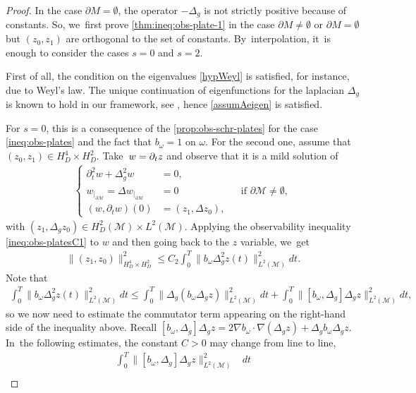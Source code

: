 \documentclass[10pt]{amsart}
\theoremstyle{definition}
\let\mc\mathcal
\newcommand{\M}{\mc{M}}
\providecommand{\norm}[1]{\lVert#1\rVert}
\begin{document}
\begin{proof}
In the case $\partial M= \emptyset$, the operator $-\Delta_g$ is not strictly positive because of constants. So, we~first prove \eqref{thm:ineq:obs-plate-1} in the case $\partial M\neq \emptyset$ or $\partial M= \emptyset$ but $(z_0, z_1)$ are orthogonal to the set of constants. By~interpolation, it~is enough to consider the cases $s=0$ and $s=2$.

First of all, the condition on the eigenvalues \eqref{hypWeyl} is satisfied, for instance, due to Weyl's law. The unique continuation of eigenfunctions for the laplacian $\Delta_g$ is known to hold in our framework, see \cite[Prop.\,5.2.]{LLR:book1}, hence \cref{assumAeigen} is satisfied.

For $s=0$, this is a consequence of the \cref{prop:obs-schr-plates} for the case \eqref{ineq:obs-plates} and the fact that $b_{\omega}=1$ on $\omega$. For the second one, assume that $(z_0, z_1)\in H^4_D\times H^2_D$. Take~$w=\nobreak\partial_t z$ and observe that it is a mild solution of
\begin{align*}
\left\{\begin{aligned}
\partial_t^2 w+\Delta_g^2 w&=0, &\\
w_{|_{\partial\M}}=\Delta w_{|_{\partial\M}}&=0 &&\text{if } \partial\M\neq\emptyset,\\
(w, \partial_t w)(0)&=(z_1, \Delta z_0),
\end{aligned}\right.
\end{align*}
with $(z_1, \Delta_g z_0)\in H_D^2(\M)\times L^2(\M)$. Applying the observability inequality \eqref{ineq:obs-platesC1} to $w$ and then going back to the $z$ variable, we~get
\begin{align*}
\norm{(z_1, z_0)}_{H_D^4\times H_D^2}^2\leq C_2\int_0^T \norm{b_\omega \Delta_g^2 z(t)}_{L^2(\M)}^2dt.
\end{align*}
Note that
\begin{align*}
\int_0^T \norm{b_\omega \Delta_g^2 z(t)}_{L^2(\M)}^2dt\leq \int_0^T \norm{\Delta_g(b_\omega\Delta_g z)}_{L^2(\M)}^2dt+\int_0^T \norm{[b_\omega, \Delta_g]\Delta_g z}_{L^2(\M)}^2dt,
\end{align*}
so we now need to estimate the commutator term appearing on the right-hand side of the inequality above. Recall $[b_\omega, \Delta_g]\Delta_g z=2\nabla b_\omega\cdot\nabla(\Delta_g z)+\Delta_g b_\omega\Delta_g z$. In~the following estimates, the constant $C>0$ may change from line to line,
\begin{align*}
\int_0^T \norm{[b_\omega, \Delta_g]\Delta_g z}_{L^2(\M)}^2&dt\\[-8pt]

\end{align*}
\end{proof}
\end{document}

